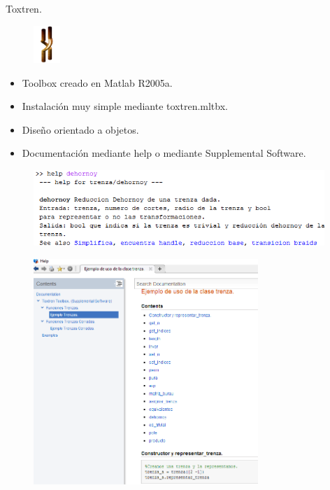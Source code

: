 \documentclass{beamer}
\begin{document}
\begin{frame}{Toxtren.}
	\begin{figure}[h!]
		\includegraphics[width=1cm]{imagenes/im.png}
	\end{figure}
     \begin{itemize}
     	\item Toolbox creado en Matlab R2005a.
     	\item Instalación muy simple mediante toxtren.mltbx.
     	\item Diseño orientado a objetos. 
     	\item Documentación mediante help o mediante Supplemental Software. 
     \end{itemize}
     \pause
     \begin{figure}[h!]
     	\includegraphics[width=11cm]{imagenes/help.png}
     \end{figure}
\end{frame}

\begin{frame}
	\begin{figure}[h!]
		\includegraphics[width=8.5cm]{imagenes/docu.png}
	\end{figure}
\end{frame}
\end{document}

